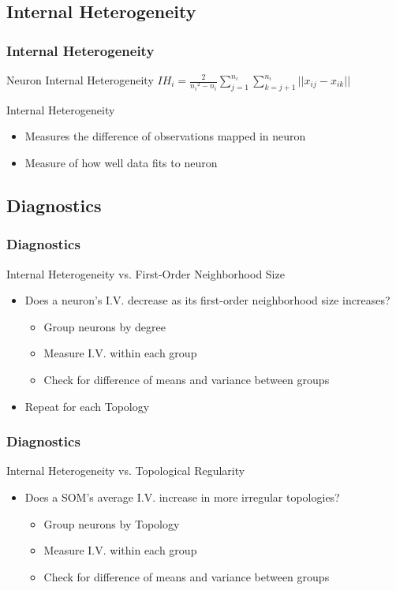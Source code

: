\documentclass[nototal,handout]{beamer}
\begin{document}
\subsection{Internal Heterogeneity} 

\begin{frame}
	\frametitle{Internal Heterogeneity}
 
\begin{block}{Neuron Internal Heterogeneity}
  \({IH_i} = \frac{2}{{n_i}^2-{n_i}}\sum_{j=1}^{n_i}\sum_{k=j+1}^{n_i} ||{x_{ij}}-{x_{ik}}||\)
 \end{block} 
\begin{block}{Internal Heterogeneity}
 \begin{itemize}
 \item  Measures the difference of observations mapped in neuron
 \item  Measure of how well data fits to neuron
 \end{itemize}
 \end{block} \end{frame} 

\subsection{Diagnostics} 

\begin{frame}
	\frametitle{Diagnostics}
 
\begin{block}{Internal Heterogeneity vs. First-Order Neighborhood Size}
 \begin{itemize}
 \item  Does a neuron's I.V. decrease as its first-order neighborhood size increases?
 \begin{itemize}
 \item  Group neurons by degree
 \item  Measure I.V. within each group
 \item  Check for difference of means and variance between groups
 \end{itemize}
 \item  Repeat for each Topology
 \end{itemize}
 \end{block} \end{frame} 

\begin{frame}
	\frametitle{Diagnostics}
 
\begin{block}{Internal Heterogeneity vs. Topological Regularity}
 \begin{itemize}
 \item  Does a SOM's average I.V. increase in more irregular topologies?
 \begin{itemize}
 \item  Group neurons by Topology
 \item  Measure I.V. within each group
 \item  Check for difference of means and variance between groups
 \end{itemize}
 \end{itemize}
 \end{block} \end{frame} 
\end{document}

